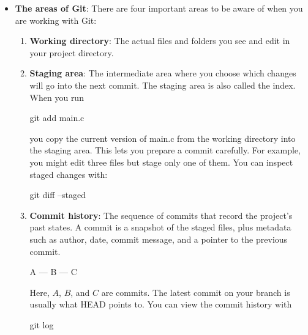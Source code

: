 \documentclass{report}
\begin{document}
\begin{itemize}
\begin{itemize}
            \end{itemize}
        \item \textbf{The areas of Git}: There are four important areas to be aware of when you are working with Git:
            \begin{enumerate}
                \item \textbf{Working directory}: The actual files and folders you see and edit in your project directory.
                \item \textbf{Staging area}: The intermediate area where you choose which changes will go into the next commit.
                    \bigbreak \noindent 
                    The staging area is also called the index. When you run
                    \bigbreak \noindent 
                    \begin{bashcode}
                        git add main.c
                    \end{bashcode}
                    \bigbreak \noindent 
                    you copy the current version of main.c from the working directory into the staging area.
                    \bigbreak \noindent 
                    This lets you prepare a commit carefully. For example, you might edit three files but stage only one of them.
                    \bigbreak \noindent 
                    You can inspect staged changes with:
                    \bigbreak \noindent 
                    \begin{cppcode}
                        git diff --staged             
                    \end{cppcode}
                \item \textbf{Commit history}: The sequence of commits that record the project’s past states. A commit is a snapshot of the staged files, plus metadata such as author, date, commit message, and a pointer to the previous commit.
                    \bigbreak \noindent 
                    \begin{center}
                        A --- B --- C
                    \end{center}
                    Here, $A$, $B$, and $C$ are commits. The latest commit on your branch is usually what HEAD points to.
                    \bigbreak \noindent 
                    You can view the commit history with
                    \bigbreak \noindent 
                    \begin{bashcode}
                        git log 
                    \end{bashcode}
                    \bigbreak \noindent 

\end{enumerate}
\end{itemize}
\end{document}
